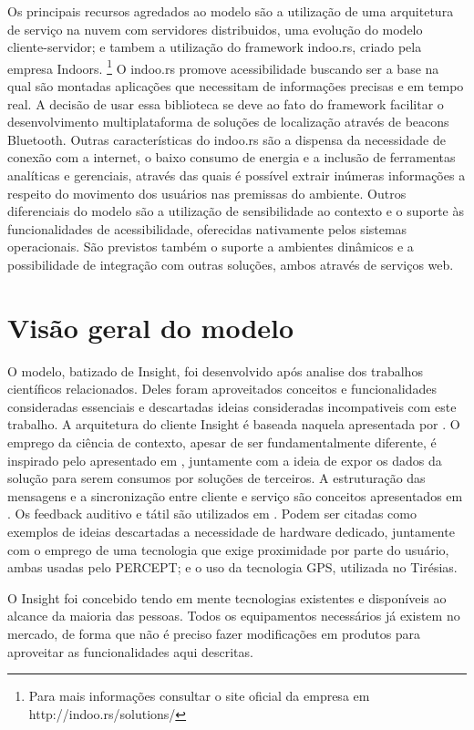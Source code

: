 \documentclass[english,brazilian]{UNISINOSmonografia}
\begin{document}
Os principais recursos agredados ao modelo são a utilização de uma arquitetura de serviço na nuvem com servidores distribuidos, uma evolução do modelo cliente-servidor; e tambem a utilização do framework indoo.rs, criado pela empresa Indoors. \footnote{Para mais informações consultar o site oficial da empresa em http://indoo.rs/solutions/} O indoo.rs promove acessibilidade buscando ser a base na qual são montadas aplicações que necessitam de informações precisas e em tempo real. A decisão de usar essa biblioteca se deve ao fato do framework facilitar o desenvolvimento multiplataforma de soluções de localização através de beacons Bluetooth. Outras características do indoo.rs são a dispensa da necessidade de conexão com a internet, o baixo consumo de energia e a inclusão de ferramentas analíticas e gerenciais, através das quais é possível extrair inúmeras informações a respeito do movimento dos usuários nas premissas do ambiente. Outros diferenciais do modelo são a utilização de sensibilidade ao contexto e o suporte às funcionalidades de acessibilidade, oferecidas nativamente pelos sistemas operacionais.
São previstos também o suporte a ambientes dinâmicos e a possibilidade de integração com outras soluções, ambos através de serviços web.

\section{Visão geral do modelo} 
O modelo, batizado de Insight, foi desenvolvido após analise dos trabalhos científicos relacionados. Deles foram aproveitados conceitos e funcionalidades consideradas essenciais e descartadas ideias consideradas incompativeis com este trabalho. A arquitetura do cliente Insight é baseada naquela apresentada por . O emprego da ciência de contexto, apesar de ser fundamentalmente diferente, é inspirado pelo apresentado em , juntamente com a ideia de expor os dados da solução para serem consumos por soluções de terceiros. A estruturação das mensagens e a sincronização entre cliente e serviço são conceitos apresentados em . Os feedback auditivo e tátil são utilizados em . Podem ser citadas como exemplos de ideias descartadas a necessidade de hardware dedicado, juntamente com o emprego de uma tecnologia que exige proximidade por parte do usuário, ambas usadas pelo PERCEPT; e o uso da tecnologia GPS, utilizada no Tirésias.

O Insight foi concebido tendo em mente tecnologias existentes e disponíveis ao alcance da maioria das pessoas. Todos os equipamentos necessários já existem no mercado, de forma que não é preciso fazer modificações em produtos para aproveitar as funcionalidades aqui descritas.
\end{document}
